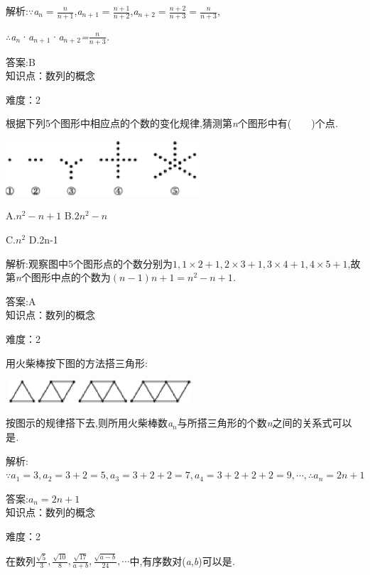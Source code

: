\documentclass{article} %
\begin{document}
 解析:\textit{$\because$a${}_{n}=\frac{n}{n+1}$},\textit{a${}_{n+}$}${}_{1}=\frac{n+1}{n+2}$,\textit{a${}_{n+}$}${}_{2}=\frac{n+2}{n+3}$\textit{$=\frac{n}{n+3}$},

\textit{$\therefore$a${}_{n}$}·\textit{a${}_{n+}$}${}_{1}$·\textit{a${}_{n+}$}${}_{2}$\textit{=}$\frac{n}{n+3}$\textit{.}

 答案:B \\

知识点：数列的概念

难度：2

 根据下列5个图形中相应点的个数的变化规律,猜测第\textit{n}个图形中有(\textit{　　})个点\textit{.}

 \includegraphics*[width=2.82in, height=0.81in, keepaspectratio=false]{image64}

 A.$n^2-n+1$ B.$2n^2-n$

 C.$n^2$ D.2n-1

 解析:观察图中5个图形点的个数分别为$1,1\times 2 + 1,2\times 3 + 1,3\times 4 + 1,4\times 5 + 1$,故第\textit{n}个图形中点的个数为$(n-1)n+1=n^2-n+1$\textit{.}

 答案:A \\

知识点：数列的概念

难度：2

 用火柴棒按下图的方法搭三角形:

 \includegraphics*[width=2.78in, height=0.34in, keepaspectratio=false]{image65}

 按图示的规律搭下去,则所用火柴棒数\textit{a${}_{n}$}与所搭三角形的个数\textit{n}之间的关系式可以是\textit{\underbar{　　　　　　　　　　}.~}

 解析:$\because a_1 = 3, a_2 = 3+2 = 5, a_3 = 3+2+2=7,a_4=3+2+2+2=9,\cdots,\therefore a_n=2n+1$

 答案:$a_n = 2n+1$ \\

知识点：数列的概念

难度：2

 在数列$\frac{\sqrt{5}}{3},\frac{\sqrt{10}}{8},
\frac{\sqrt{17}}{a+b},\frac{\sqrt{a-b}}{24},\cdots$中,有序数对(\textit{a},\textit{b})可以是\textit{\underbar{　　　　　　　　}.~}
\end{document}
